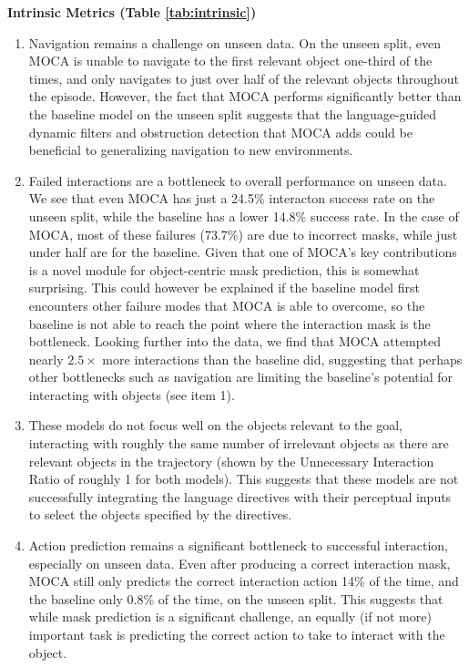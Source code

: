 \documentclass[11pt,a4paper]{article}
\begin{document}
\textbf{Intrinsic Metrics (Table \ref{tab:intrinsic})} 
\begin{enumerate}
    \item Navigation remains a challenge on unseen data. On the unseen split, even MOCA is unable to navigate to the first relevant object one-third of the times, and only navigates to just over half of the relevant objects throughout the episode. However, the fact that MOCA performs significantly better than the baseline model on the unseen split suggests that the language-guided dynamic filters and obstruction detection that MOCA adds could be beneficial to generalizing navigation to new environments.
    \item Failed interactions are a bottleneck to overall performance on unseen data. We see that even MOCA has just a 24.5\% interacton success rate on the unseen split, while the baseline has a lower 14.8\% success rate. In the case of MOCA, most of these failures (73.7\%) are due to incorrect masks, while just under half are for the baseline. Given that one of MOCA's key contributions is a novel module for object-centric mask prediction, this is somewhat surprising. This could however be explained if the baseline model first encounters other failure modes that MOCA is able to overcome, so the baseline is not able to reach the point where the interaction mask is the bottleneck. Looking further into the data, we find that MOCA attempted nearly $2.5\times$ more interactions than the baseline did, suggesting that perhaps other bottlenecks such as navigation are limiting the baseline's potential for interacting with objects (see item 1).
    \item These models do not focus well on the objects relevant to the goal, interacting with roughly the same number of irrelevant objects as there are relevant objects in the trajectory (shown by the Unnecessary Interaction Ratio of roughly 1 for both models). This suggests that these models are not successfully integrating the language directives with their perceptual inputs to select the objects specified by the directives.
    \item Action prediction remains a significant bottleneck to successful interaction, especially on unseen data. Even after producing a correct interaction mask, MOCA still only predicts the correct interaction action 14\% of the time, and the baseline only 0.8\% of the time, on the unseen split. This suggests that while mask prediction is a significant challenge, an equally (if not more) important task is predicting the correct action to take to interact with the object.
\end{enumerate}
\end{document}
